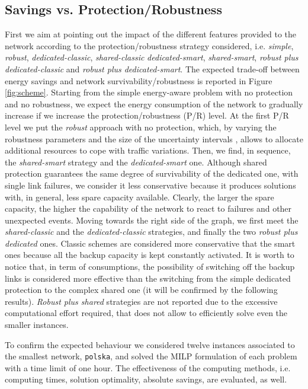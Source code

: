 \documentclass[final,5p,times,twocolumn]{elsarticle}
\begin{document}
\subsection{Savings vs. Protection/Robustness}\label{sec:rob_prot}First we aim at pointing out the impact of the different features provided to the network according to the protection/robustness strategy considered, i.e. \textit{simple}, \textit{robust}, \textit{dedicated-classic}, \textit{shared-classic} \textit{dedicated-smart}, \textit{shared-smart}, \textit{robust plus dedicated-classic} and  \textit{robust plus dedicated-smart}. The expected trade-off between energy savings and network survivability/robustness is reported in Figure \ref{fig:scheme}.
Starting from the simple energy-aware problem with no protection and no robustness, we expect the energy consumption of the network to gradually increase  if we increase the protection/robustness (P/R) level. At the first P/R level we put the \textit{robust} approach with no protection, which, by varying the robustness parameters   and the size of the uncertainty intervals , allows to allocate additional resources to cope with traffic variations. Then, we find, in sequence,  the \textit{shared-smart} strategy and the \textit{dedicated-smart} one. Although shared protection guarantees the same degree of survivability of the dedicated one, with single link failures, we consider it less conservative because it produces solutions with, in general, less spare capacity available. Clearly, the larger  the spare capacity, the higher the capability of the network to react to failures and other unexpected events. Moving towards the right side of the graph, we first meet the \textit{shared-classic} and the \textit{dedicated-classic} strategies, and finally the two \textit{robust plus dedicated} ones. Classic schemes are considered more conservative that the smart ones because all the backup capacity is kept constantly activated. It is worth to notice that, in term of consumptions, the possibility of switching off the backup links is considered more effective than the switching from the simple dedicated protection to the complex shared one (it will be confirmed by the following results).  \textit{Robust plus shared} strategies are not reported due to the excessive computational effort required, that does not allow to efficiently solve even the smaller instances. 

To confirm the expected behaviour we considered twelve instances associated to the smallest network,  {\tt polska}, and solved the MILP formulation of each problem with a time limit of one hour.  The effectiveness of the computing methods, i.e. computing times, solution optimality, absolute savings, are evaluated, as well.
\end{document}
